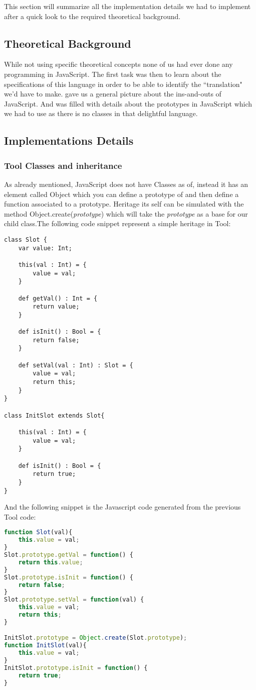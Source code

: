 This section will summarize all the implementation details we had to implement after a quick
look to the required theoretical background.

\subsection{Theoretical Background}
While not using specific theoretical concepts none of us had ever done any programming in JavaScript.
The first task was then to learn about the specifications of this language in order to be able to identify the ``translation" we'd have to make. \cite{JSGood} gave us a general picture about the ins-and-outs of JavaScript.
And \cite{JSProto} was filled with details about the prototypes in JavaScript which we had to use as there is no classes in that delightful language.

\subsection{Implementations Details}
\subsubsection{Tool Classes and inheritance}
As already mentioned, JavaScript does not have Classes as of, instead it has an element called Object which you can define a prototype of and then define a function associated to a prototype. Heritage its self can be simulated with the method Object.create(\emph{prototype}) which will take the \emph{prototype} as a base for our child class.The following code snippet represent a simple heritage in Tool:
\begin{lstlisting}
class Slot {
	var value: Int;

	this(val : Int) = {
		value = val;
	}

	def getVal() : Int = {
		return value;
	}

	def isInit() : Bool = {
		return false;
	}

	def setVal(val : Int) : Slot = {
		value = val;
		return this;
	}
}

class InitSlot extends Slot{

	this(val : Int) = {
		value = val;
	}

	def isInit() : Bool = {
		return true;
	}
}
\end{lstlisting}

And the following snippet is the Javascript code generated from the previous Tool code:
\begin{lstlisting}[language=javascript]
function Slot(val){
    this.value = val;
}
Slot.prototype.getVal = function() { 
    return this.value;
}
Slot.prototype.isInit = function() { 
    return false;
}
Slot.prototype.setVal = function(val) { 
    this.value = val;
    return this;
}

InitSlot.prototype = Object.create(Slot.prototype);
function InitSlot(val){
    this.value = val;
}
InitSlot.prototype.isInit = function() { 
    return true;
}

\end{lstlisting}

